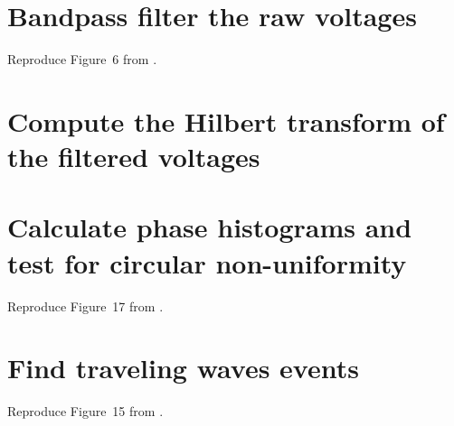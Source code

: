 \documentclass[12pt]{article}
\begin{document}
\section{Bandpass filter the raw voltages}

Reproduce Figure~6 from \citet{rapelaInPrepTWsInSpeech}.

\section{Compute the Hilbert transform of the filtered voltages}

\section{Calculate phase histograms and test for circular non-uniformity}

Reproduce Figure~17 from \citet{rapelaInPrepSyncTWs}.

\section{Find traveling waves events}

Reproduce Figure~15 from \citet{rapelaInPrepSyncTWsII}.



\end{document}
